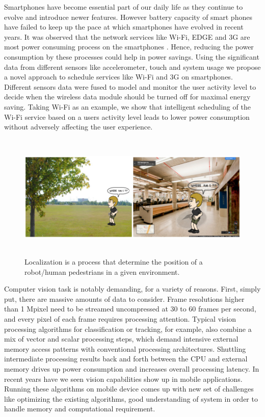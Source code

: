 Smartphones have become essential part of our daily life as they continue to evolve and introduce newer features. However battery capacity of smart phones have failed to keep up the pace at which smartphones have evolved in recent years. It was observed that the network services like Wi-Fi, EDGE and 3G are most power consuming process on the smartphones \cite{carroll2010analysis}. Hence, reducing the power consumption by these processes could help in power savings. Using the significant data from different sensors like accelerometer, touch and system usage we propose a novel approach to schedule services like Wi-Fi and 3G on smartphones. Different sensors data were fused to model and monitor the user activity level to decide when the wireless data module should be turned off for maximal energy saving. Taking Wi-Fi as an example, we show that intelligent scheduling of the Wi-Fi service based on a users activity level leads to lower power consumption without adversely affecting the user experience. \par
\begin{figure}[h]
\includegraphics[width=\columnwidth,height=6cm]{figures/localization.png}
\caption{Localization is a process that determine the position of a
robot/human pedestrians in a given environment.}
\label{fig:localization}
\end{figure}
Computer vision task is notably demanding, for a variety of reasons. First, simply put, there are massive amounts of data to consider. Frame resolutions higher than 1 Mpixel need to be streamed uncompressed at 30 to 60 frames per second, and every pixel of each frame requires processing attention. Typical vision processing algorithms for classification or tracking, for example, also combine a mix of vector and scalar processing steps, which demand intensive external memory access patterns with conventional processing architectures. Shuttling intermediate processing results back and forth between the CPU and external memory drives up power consumption and increases overall processing latency. In recent years have we seen vision capabilities show up in mobile applications. Running these algorithms on mobile device comes up with new set of challenges like optimizing the existing algorithms, good understanding of system in order to handle memory and computational requirement.

